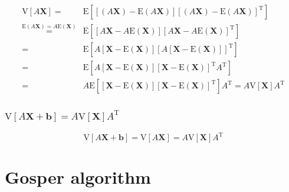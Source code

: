 \documentclass[
]{book}
\theoremstyle{definition}
\theoremstyle{definition}
\theoremstyle{definition}
\theoremstyle{definition}
\theoremstyle{remark}
\begin{document}
\begin{align*}
\mathrm{V}\left[A\boldsymbol{X}\right]= & \mathrm{E}\left[\left[\left(A\boldsymbol{X}\right)-\mathrm{E}\left(A\boldsymbol{X}\right)\right]\left[\left(A\boldsymbol{X}\right)-\mathrm{E}\left(A\boldsymbol{X}\right)\right]^{\mathrm{T}}\right]\\
\overset{\mathrm{E}\left(A\boldsymbol{X}\right)=A\mathrm{E}\left(\boldsymbol{X}\right)}{=} & \mathrm{E}\left[\left[A\boldsymbol{X}-A\mathrm{E}\left(\boldsymbol{X}\right)\right]\left[A\boldsymbol{X}-A\mathrm{E}\left(\boldsymbol{X}\right)\right]^{\mathrm{T}}\right]\\
= & \mathrm{E}\left[A\left[\boldsymbol{X}-\mathrm{E}\left(\boldsymbol{X}\right)\right]\left[A\left[\boldsymbol{X}-\mathrm{E}\left(\boldsymbol{X}\right)\right]\right]^{\mathrm{T}}\right]\\
= & \mathrm{E}\left[A\left[\boldsymbol{X}-\mathrm{E}\left(\boldsymbol{X}\right)\right]\left[\boldsymbol{X}-\mathrm{E}\left(\boldsymbol{X}\right)\right]^{\mathrm{T}}A^{\mathrm{T}}\right]\\
= & A\mathrm{E}\left[\left[\boldsymbol{X}-\mathrm{E}\left(\boldsymbol{X}\right)\right]\left[\boldsymbol{X}-\mathrm{E}\left(\boldsymbol{X}\right)\right]^{\mathrm{T}}\right]A^{\mathrm{T}}=A\mathrm{V}\left[\boldsymbol{X}\right]A^{\mathrm{T}}
\end{align*}

\hypertarget{mathrmvleftaboldsymbolxboldsymbolbrightamathrmvleftboldsymbolxrightamathrmt}{%
\subsection{\texorpdfstring{\(\mathrm{V}\left[A\boldsymbol{X}+\boldsymbol{b}\right]=A\mathrm{V}\left[\boldsymbol{X}\right]A^{\mathrm{T}}\)}{\textbackslash mathrm\{V\}\textbackslash left{[}A\textbackslash boldsymbol\{X\}+\textbackslash boldsymbol\{b\}\textbackslash right{]}=A\textbackslash mathrm\{V\}\textbackslash left{[}\textbackslash boldsymbol\{X\}\textbackslash right{]}A\^{}\{\textbackslash mathrm\{T\}\}}}\label{mathrmvleftaboldsymbolxboldsymbolbrightamathrmvleftboldsymbolxrightamathrmt}}

\[
\mathrm{V}\left[A\boldsymbol{X}+\boldsymbol{b}\right]=\mathrm{V}\left[A\boldsymbol{X}\right]=A\mathrm{V}\left[\boldsymbol{X}\right]A^{\mathrm{T}}
\]

\hypertarget{gosper-algorithm}{%
\chapter{Gosper algorithm}\label{gosper-algorithm}}
\end{document}
